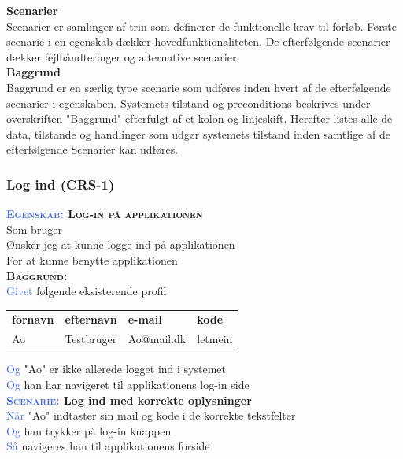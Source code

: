 \clearpage

\large{\textbf{Scenarier}}\\
Scenarier er samlinger af trin som definerer de funktionelle krav til 
forløb. Første scenarie i en egenskab dækker hovedfunktionaliteten. De 
efterfølgende scenarier dækker fejlhåndteringer og alternative scenarier.\\
\large{\textbf{Baggrund}}\\
Baggrund er en særlig type scenarie som udføres inden hvert af de 
efterfølgende scenarier	i egenskaben. Systemets tilstand og preconditions 
beskrives under overskriften "Baggrund" efterfulgt af et kolon og 
linjeskift. Herefter listes alle de data, tilstande og handlinger som udgør 
systemets tilstand inden samtlige af de efterfølgende Scenarier kan	udføres.


\subsubsection{Log ind (CRS-1)} \label{sec:USLogInd}
\textbf{\textsc{\textcolor{RoyalBlue} {Egenskab:} Log-in på applikationen}} \\
Som bruger\\
Ønsker jeg at kunne logge ind på applikationen\\
For at kunne benytte applikationen\\

\textbf{\textsc{\color{RoyalBlue}Baggrund:}}\\
\textcolor{RoyalBlue}{Givet} følgende eksisterende profil\\
\begin{tabular}{| l | l | l | l |}
	\textbf{fornavn} & \textbf{efternavn} & \textbf{e-mail} & \textbf{kode} \\
	Ao & Testbruger & Ao@mail.dk & letmein\\
\end{tabular}
\newline \newline
\textcolor{RoyalBlue}{Og} "Ao" er ikke allerede logget ind i systemet\\
\textcolor{RoyalBlue}{Og} han har navigeret til applikationens log-in side\\

\textbf{\textsc{\textcolor{RoyalBlue}{Scenarie:}} Log ind med korrekte oplysninger}\\
\textcolor{RoyalBlue}{Når} "Ao" indtaster sin mail og kode i de korrekte tekstfelter\\
\textcolor{RoyalBlue}{Og} han trykker på log-in knappen\\
\textcolor{RoyalBlue}{Så} navigeres han til applikationens forside\\

